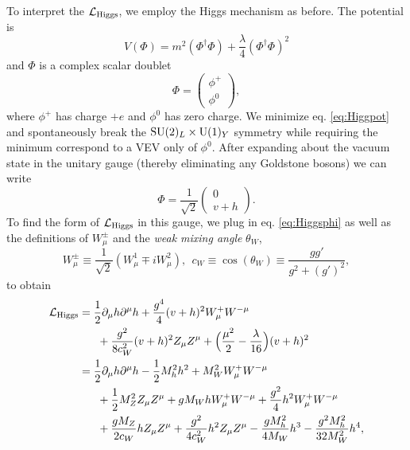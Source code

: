 To interpret the $\mathcal{L}_{\rm Higgs}$, we employ the Higgs mechanism 
as before. The potential is
\begin{equation}
  \label{eq:Higgpot}
  V(\Phi)=m^2(\Phi^{\dagger}\Phi)+\frac{\lambda}{4}(\Phi^{\dagger}\Phi)^2
\end{equation}
and $\Phi$ is a complex scalar doublet
\begin{equation}
  \label{eq:newphi}
  \Phi=
  \begin{pmatrix}
    \phi^{+} \\
    \phi^{0}
  \end{pmatrix},
\end{equation}
where $\phi^{+}$ has charge $+e$ and $\phi^{0}$ has zero charge. We minimize
eq. \eqref{eq:Higgpot} and spontaneously break the $\operatorname{SU}(2)_{L}\times\operatorname{U}(1)_{Y}$ 
symmetry while requiring the minimum correspond to a VEV only of $\phi^{0}$.
After expanding about the vacuum state in the unitary 
gauge (thereby eliminating any Goldstone bosons) we can write
\begin{equation}
  \label{eq:Higgsphi}
  \Phi=\frac{1}{\sqrt{2}}
  \begin{pmatrix}
    0 \\
    v+h
  \end{pmatrix}.
\end{equation}
To find the form of $\mathcal{L}_{\rm Higgs}$ in this gauge, we plug in 
eq. \eqref{eq:Higgsphi}
as well as the definitions of $W^{\pm}_{\mu}$ and the {\it weak mixing angle} 
$\theta_W$,
\begin{equation}
  W^{\pm}_{\mu}\equiv\frac{1}{\sqrt{2}}(W^{1}_{\mu}\mp iW^{2}_{\mu}),
  \ \ c_W\equiv\cos(\theta_W)\equiv\frac{gg'}{g^2+(g')^2},
\end{equation}
to obtain
\begin{equation}
  \label{eq:LagrHiggs}
  \begin{aligned}
    \mathcal{L}_{\rm Higgs}&=\frac{1}{2}\partial_{\mu}h\partial^{\mu}h
                   +\frac{g^4}{4}(v+h)^{2}W^+_{\mu}W^{-\mu} \\
       & ~~~~~     +\frac{g^2}{8c_{W}^{2}}(v+h)^{2}Z_{\mu}Z^{\mu}
                   +\Big(\frac{\mu^2}{2}-\frac{\lambda}{16}\Big)(v+h)^{2} \\
       &=\frac{1}{2}\partial_{\mu}h\partial^{\mu}h
         -\frac{1}{2}M_{h}^{2}h^2 + M_{W}^{2}W^+_{\mu}W^{-\mu} \\
       & ~~~~~ +\frac{1}{2}M_{Z}^{2}Z_{\mu}Z^{\mu} 
         + gM_{W}hW^+_{\mu}W^{-\mu}
         +\frac{g^2}{4}h^{2}W^+_{\mu}W^{-\mu} \\
       & ~~~~~ +\frac{gM_{Z}}{2c_{W}}hZ_{\mu}Z^{\mu}
         +\frac{g^2}{4c_{W}^{2}}h^{2}Z_{\mu}Z^{\mu}
         -\frac{gM_{h}^2}{4M_W}h^3 - \frac{g^{2}M_{h}^2}{32M_{W}^2}h^4,
  \end{aligned}
\end{equation}
